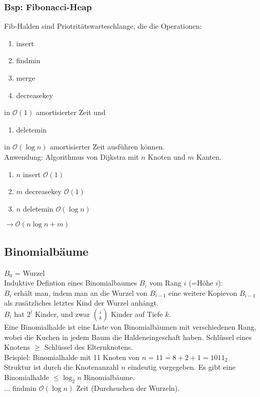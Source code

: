 \subsubsection{Bsp: Fibonacci-Heap}
Fib-Halden sind Priotritätswarteschlange, die die Operationen:
\begin{enumerate}
\item insert
\item findmin
\item merge
\item decreasekey
\end{enumerate}
in $\mathcal{O}(1)$ amortisierter Zeit und 
\begin{enumerate}
\item deletemin
\end{enumerate}
in $\mathcal{O}(\log n)$ amortisierter Zeit ausführen können.\\
Anwendung: Algorithmus von Dijkstra mit $n$ Knoten und $m$ Kanten.\\
\begin{enumerate}
\item $n$ insert $\mathcal{O}(1)$
\item $m$ decreasekey $\mathcal{O}(1)$
\item $n$ deletemin $\mathcal{O}(\log	n)$
\end{enumerate}
$\rightarrow \mathcal{O}(n \log n + m)$\\
\subsection{Binomialbäume}
$B_0$ = Wurzel\\
Induktive Defintion eines Binomialbaumes $B_i$ vom Rang $i$ (=Höhe $i$):\\
$B_i$ erhält man, indem man an die Wurzel von $B_{i-1}$ eine weitere Kopievon $B_{i-1}$ als zusätzliches letztes Kind der Wurzel anhängt.\\
$B_i$ hat $2^i$ Kinder, und zwar $\binom{i}{k}$ Kinder auf Tiefe $k$.\\
Eine Binomialhalde ist eine Liste von Binomialbäumen mit verschiedenen Rang, wobei die Kuchen in jedem Baum die Haldeneingeschaft haben. Schlüssel eines Knotens $\geq$ Schlüssel des Elternknotens.\\
Beispiel: Binomialhalde mit 11 Knoten von $n=11=8+2+1=1011_2$\\
Struktur ist durch die Knotenanzahl $n$ eindeutig vorgegeben. Es gibt eine Binomialhalde $\leq \log_2 n$ Binomialbäume.\\
... findmin $\mathcal{O}(\log n)$ Zeit (Durchsuchen der Wurzeln).\\
